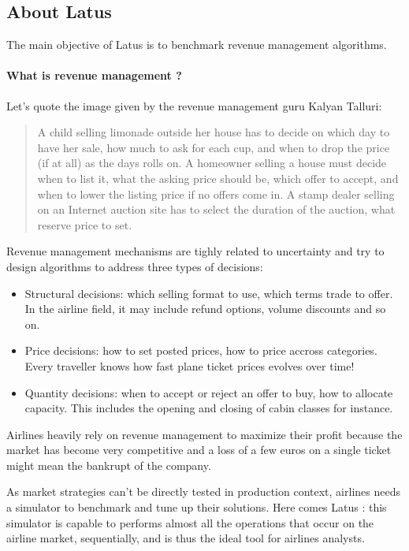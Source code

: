 \documentclass[11pt]{JHEP3}
\begin{document}
\subsection{About Latus}


The main objective of Latus is to benchmark revenue management algorithms. 

\paragraph{What is revenue management ?} Let's quote the image given by the revenue management guru Kalyan Talluri:

\begin{quote}
A child selling limonade outside her house has to decide on which day to have her sale, how much to ask for each cup, and when to drop the price (if at all) as the days rolls on. A homeowner selling a house must decide when to list it, what the asking price should be, which offer to accept, and when to lower the listing price if no offers come in. A stamp dealer selling on an Internet auction site has to select the duration of the auction, what reserve price to set.
\end{quote} 

Revenue management mechanisms are tighly related to uncertainty and try to design algorithms to address three types of decisions: 

\begin{itemize}
\item Structural decisions: which selling format to use, which terms trade to offer. In the airline field, it may include refund options, volume discounts and so on.
\item Price decisions: how to set posted prices, how to price accross categories. Every traveller knows how fast plane ticket prices evolves over time!
\item Quantity decisions: when to accept or reject an offer to buy, how to allocate capacity. This includes the opening and closing of cabin classes for instance.
\end{itemize}

Airlines heavily rely on revenue management to maximize their profit because the market has become very competitive and a loss of a few euros on a single ticket might mean the bankrupt of the company. 

As market strategies can't be directly tested in production context, airlines needs a simulator to benchmark and tune up their solutions. Here comes Latus : this simulator is capable to performs almost all the operations that occur on the airline market, sequentially, and is thus the ideal tool for airlines analysts. 
\end{document}

